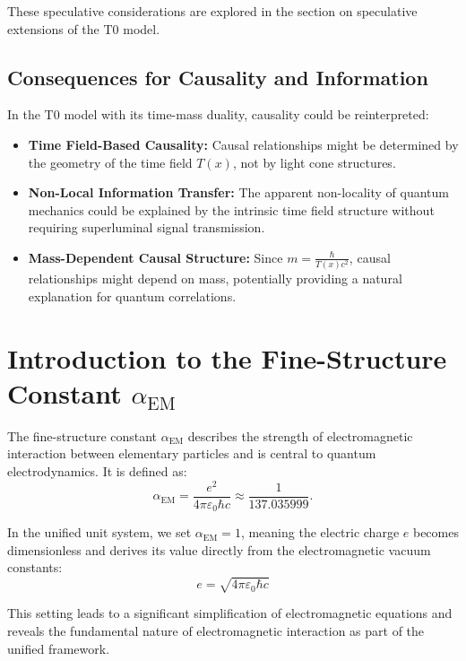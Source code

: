 \documentclass[12pt,a4paper]{article}
\newcommand{\Tfield}{T(x)}
\newcommand{\alphaEM}{\alpha_{\text{EM}}}
\begin{document}
	These speculative considerations are explored in the section on speculative extensions of the T0 model.
	
	\subsection{Consequences for Causality and Information}
	
	In the T0 model with its time-mass duality, causality could be reinterpreted:
	\begin{itemize}
		\item \textbf{Time Field-Based Causality:} Causal relationships might be determined by the geometry of the time field \(\Tfield\), not by light cone structures.
		\item \textbf{Non-Local Information Transfer:} The apparent non-locality of quantum mechanics could be explained by the intrinsic time field structure without requiring superluminal signal transmission.
		\item \textbf{Mass-Dependent Causal Structure:} Since \(m = \frac{\hbar}{\Tfield c^2}\), causal relationships might depend on mass, potentially providing a natural explanation for quantum correlations.
	\end{itemize}
	
	\section{Introduction to the Fine-Structure Constant \(\alphaEM\)}
	
	The fine-structure constant \(\alphaEM\) describes the strength of electromagnetic interaction between elementary particles and is central to quantum electrodynamics. It is defined as:
	\begin{equation}
		\alphaEM = \frac{e^2}{4\pi \varepsilon_0 \hbar c} \approx \frac{1}{137.035999}.
	\end{equation}
	
	In the unified unit system, we set \(\alphaEM = 1\), meaning the electric charge \(e\) becomes dimensionless and derives its value directly from the electromagnetic vacuum constants:
	\begin{equation}
		e = \sqrt{4\pi \varepsilon_0 \hbar c}
	\end{equation}
	
	This setting leads to a significant simplification of electromagnetic equations and reveals the fundamental nature of electromagnetic interaction as part of the unified framework.
	
\end{document}
